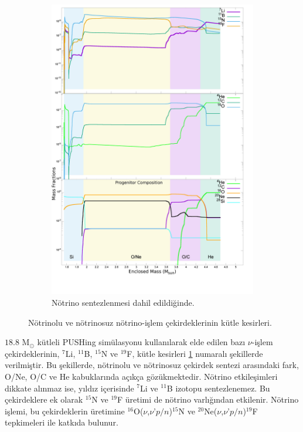 \begin{figure}[hbt!]
\begin{subfigure}{.49\textwidth}
		\includegraphics[width=\textwidth]{figures/abundadecay_he4li7b11c12n15o16f19_hor}
		\caption[Nötrino Sentezlenmesi Dahil Edildiğinde]{Nötrino sentezlenmesi dahil edildiğinde.}
	\end{subfigure}
	\caption[Nötrinolu Ve Nötrinosuz Nötrino-işlem Çekirdeklerinin Kütle Kesirleri]{Nötrinolu ve nötrinosuz nötrino-işlem çekirdeklerinin kütle kesirleri.}
    \label{fig:he4li7b11c12n15o16f19_abund_comp}
\end{figure}

$18.8$ M$ _{\odot} $ kütleli PUSHing simülasyonu kullanılarak elde edilen bazı $ \nu $-işlem çekirdeklerinin, $ ^{7} $Li, $ ^{11} $B, $ ^{15} $N ve $ ^{19} $F, kütle kesirleri \ref{fig:he4li7b11c12n15o16f19_abund_comp} numaralı şekillerde verilmiştir. Bu şekillerde, nötrinolu ve nötrinosuz çekirdek sentezi arasındaki fark, O/Ne, O/C ve He kabuklarında açıkça gözükmektedir. Nötrino etkileşimleri dikkate alınmaz ise, yıldız içerisinde $ ^{7} $Li ve $ ^{11} $B izotopu sentezlenemez. Bu çekirdeklere ek olarak $ ^{15} $N ve $ ^{19} $F üretimi de nötrino varlığından etkilenir. Nötrino işlemi, bu çekirdeklerin üretimine $ ^{16} $O($ \nu $,$ \nu $'$ p/n $)$ ^{15} $N ve $ ^{20} $Ne($ \nu $,$ \nu $'$ p/n $)$ ^{19} $F tepkimeleri ile katkıda bulunur.

